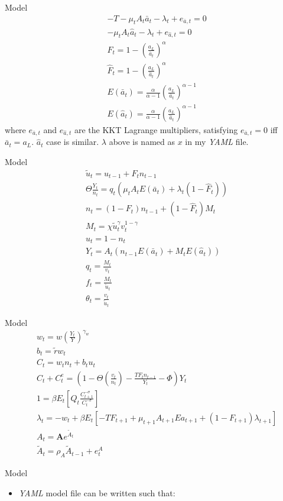 \documentclass{beamer}
\begin{document}
\begin{frame}{Model}
    \begin{align}
    &-T-\mu_tA_t\bar{a}_t-\lambda_t+e_{\bar{a},t}=0\\
    & -\mu_tA_t\hat{a}_t-\lambda_t+e_{\hat{a},t}=0\\
    &F_t=1-(\frac{a_L}{\bar{a}_t})^{\alpha}\\
    &\hat{F}_t=1-(\frac{a_L}{\hat{a}_t})^{\alpha}\\
    &E(\bar{a}_t)=\frac{\alpha}{\alpha-1}(\frac{a_L}{\bar{a}_t})^{\alpha-1}\\
    &E(\hat{a}_t)=\frac{\alpha}{\alpha-1}(\frac{a_L}{\hat{a}_t})^{\alpha-1}
      \end{align}
      where $e_{\bar{a},t}$ and $e_{\hat{a},t}$ are the KKT Lagrange multipliers, satisfying $e_{\bar{a},t}=0$ iff $\bar{a}_t=a_L$. $\hat{a}_t$ case is similar. $\lambda$ above is named as $x$ in my \textit{YAML} file. 
\end{frame}

\begin{frame}{Model}
    \begin{align}
     &\tilde{u}_t=u_{t-1}+F_tn_{t-1}\\
     &\Theta\frac{Y_t}{n_t}=q_t(\mu_tA_tE(\bar{a}_t)+\lambda_t(1-\hat{F}_t))\\
    &n_t=(1-F_t)n_{t-1}+(1-\hat{F}_t)M_{t}\\
    &M_t=\chi \tilde{u}_{t}^\gamma v_{t}^{1-\gamma}\\
    &u_t=1-n_t\\
    &Y_t=A_t(n_{t-1}E(\bar{a}_t)+M_tE(\hat{a}_t))\\
    &q_t= \frac{M_t}{v_t} \\
    &f_t=\frac{M_t}{\tilde{u}_{t}}\\
    &\theta_t=\frac{v_t}{\tilde{u}_t}
    \end{align}
\end{frame}
\begin{frame}{Model}
    \begin{align}
      &w_t=w(\frac{Y_t}{Y})^{\gamma_w}\\
    &b_t=\tilde{r}w_t\\
    &C_t=w_tn_t+b_tu_t\\
     &C_t+C_t^e=(1-\Theta(\frac{ v_t}{n_t})-\frac{TF_tn_{t-1}}{Y_t} -\Phi)Y_t\\
    &1= \beta E_t\left[Q_t\frac{C_{t+1}^{-\sigma}}{C_t^{-\sigma}}\right]\\
    & \lambda_t=-w_t+\beta E_t[-TF_{t+1}+\mu_{t+1}A_{t+1}Ea_{t+1}+(1-F_{t+1})\lambda_{t+1}]\\  & A_t=\textbf{A}e^{\tilde{A}_t}\\
    & \tilde{A}_t=\rho_A \tilde{A}_{t-1}+e_t^A
      \end{align}
\end{frame}
\begin{frame}{Model}
    \begin{itemize}
        \item \textit{YAML} model file can be written such that:
    \end{itemize}
\end{frame}
\end{document}
